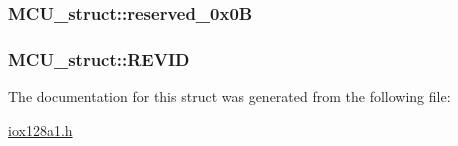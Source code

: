 \label{struct_m_c_u__struct_a3bc1309f84f8a8bb4e1e090596152bae}
\hypertarget{struct_m_c_u__struct_aa0d8450ddd757697248d3782d4f72b9a}{
\subsubsection[{reserved\_\-0x0B}]{ {\bf MCU\_\-struct::reserved\_\-0x0B}}}
\label{struct_m_c_u__struct_aa0d8450ddd757697248d3782d4f72b9a}
\hypertarget{struct_m_c_u__struct_a88e3c48004744d44ddce07f8773a80f9}{
\subsubsection[{REVID}]{ {\bf MCU\_\-struct::REVID}}}
\label{struct_m_c_u__struct_a88e3c48004744d44ddce07f8773a80f9}


The documentation for this struct was generated from the following file:\begin{DoxyCompactItemize}
\item 
\hyperlink{iox128a1_8h}{iox128a1.h}\end{DoxyCompactItemize}
